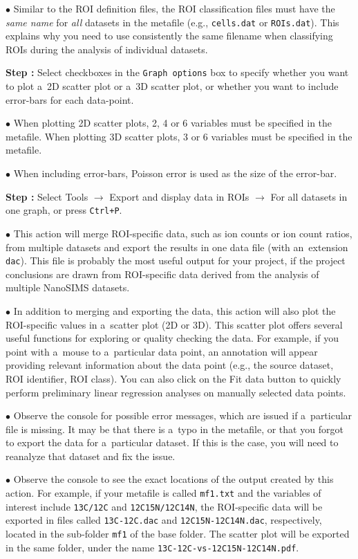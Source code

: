 \documentclass[a4paper, 11pt]{article}
\newcommand{\ttt}[1]{\texttt{#1}}
\newcommand{\lans}[1]{{\color{magenta}#1}}
\newcommand{\lanscb}[1]{{\color{darkgreen}#1}}
\newcommand{\lanstf}[1]{{\color{cyan}#1}}
\newcommand\ra{\rightarrow}
\newcounter{step}
\newcommand\s{\addtocounter{step}{1}\noindent\textbf{Step \thestep:}{ }}
\newcommand\bul{\noindent$\bullet${ }}
\begin{document}
\bul Similar to the ROI definition files, the ROI classification files must have the \emph{same name} for \emph{all} datasets in the metafile (e.g., \ttt{cells.dat} or \ttt{ROIs.dat}). This explains why you need to use consistently the same filename when classifying ROIs during the analysis of individual datasets.

\s Select checkboxes in the \ttt{Graph options} box to specify whether you want to plot a~\lanscb{2D} scatter plot or a~\lanscb{3D} scatter plot, or whether you want to include \lanscb{error-bars} for each data-point. 

\bul When plotting 2D scatter plots, 2, 4 or 6 variables must be specified in the metafile. When plotting 3D scatter plots, 3 or 6 variables must be specified in the metafile. 

\bul When including error-bars, Poisson error is used as the size of the error-bar.

\s Select \lans{Tools} $\ra$ \lans{Export and display data in ROIs} $\ra$ \lans{For all datasets in one graph}, or press \ttt{Ctrl+P}.

\bul This action will merge ROI-specific data, such as ion counts or ion count ratios, from multiple datasets and export the results in one data file (with an~extension \ttt{dac}). This file is probably the most useful output for your project, if the project conclusions are drawn from ROI-specific data derived from the analysis of multiple NanoSIMS datasets.

\bul In addition to merging and exporting the data, this action will also plot the ROI-specific values in a~scatter plot (2D or 3D). This scatter plot offers several useful functions for exploring or quality checking the data. For example, if you point with a~mouse to a~particular data point, an annotation will appear providing relevant information about the data point (e.g., the source dataset, ROI identifier, ROI class). You can also click on the \lans{Fit data} button to quickly perform preliminary linear regression analyses on manually selected data points.

\bul Observe the console for possible error messages, which are issued if a~particular file is missing. It may be that there is a~typo in the metafile, or that you forgot to export the data for a~particular dataset. If this is the case, you will need to reanalyze that dataset and fix the issue.

\bul Observe the console to see the exact locations of the output created by this action. For example, if your metafile is called \ttt{mf1.txt} and the variables of interest include \ttt{13C/12C} and \ttt{12C15N/12C14N}, the ROI-specific data will be exported in files called \ttt{13C-12C.dac} and \ttt{12C15N-12C14N.dac}, respectively, located in the sub-folder \ttt{mf1} of the \lanstf{base folder}. The scatter plot will be exported in the same folder, under the name \ttt{13C-12C-vs-12C15N-12C14N.pdf}.
\end{document}
